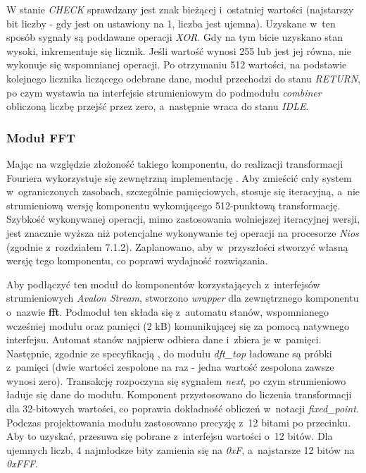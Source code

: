 W stanie \textit{CHECK} sprawdzany jest znak bieżącej i~ostatniej wartości (najstarszy bit liczby - gdy jest on ustawiony na 1, liczba jest ujemna). Uzyskane w~ten sposób sygnały są poddawane operacji \textit{XOR}. Gdy na tym bicie uzyskano stan wysoki, inkrementuje się licznik. Jeśli wartość wynosi 255 lub jest jej równa, nie wykonuje się wspomnianej operacji. Po otrzymaniu 512 wartości, na podstawie kolejnego licznika liczącego odebrane dane, moduł przechodzi do stanu \textit{RETURN}, po czym wystawia na interfejsie strumieniowym do podmodułu \textit{combiner} obliczoną liczbę przejść przez zero, a~następnie wraca do stanu \textit{IDLE}.

\subsubsection{Moduł FFT}

Mając na względzie złożoność takiego komponentu, do realizacji transformacji Fouriera wykorzystuje się zewnętrzną implementację \cite{Spiral}. Aby zmieścić cały system w~ograniczonych zasobach, szczególnie pamięciowych, stosuje się iteracyjną, a~nie strumieniową wersję komponentu wykonującego 512-punktową transformację. Szybkość wykonywanej operacji, mimo zastosowania wolniejszej iteracyjnej wersji, jest znacznie wyższa niż potencjalne wykonywanie tej operacji na procesorze \textit{Nios} (zgodnie z~rozdziałem 7.1.2). Zaplanowano, aby w~przyszłości stworzyć własną wersję tego komponentu, co poprawi wydajność rozwiązania.

Aby podłączyć ten moduł do komponentów korzystających z~interfejsów strumieniowych \textit{Avalon Stream}, stworzono \textit{wrapper} dla zewnętrznego komponentu o~nazwie \textbf{fft}. Podmoduł ten składa się z~automatu stanów, wspomnianego wcześniej modułu oraz pamięci (2 kB) komunikującej się za pomocą natywnego interfejsu. Automat stanów najpierw odbiera dane i~zbiera je w~pamięci. Następnie, zgodnie ze specyfikacją \cite{Spiral}, do modułu \textit{dft\_top} ładowane są próbki z~pamięci (dwie wartości zespolone na raz - jedna wartość zespolona zawsze wynosi zero). Transakcję rozpoczyna się sygnałem \textit{next}, po czym strumieniowo ładuje się dane do modułu. Komponent przystosowano do liczenia transformacji dla 32-bitowych wartości, co poprawia dokładność obliczeń w~notacji \textit{fixed\_point}. Podczas projektowania modułu zastosowano precyzję z~12 bitami po przecinku. Aby to uzyskać, przesuwa się pobrane z~interfejsu wartości o~12 bitów. Dla ujemnych liczb, 4 najmłodsze bity zamienia się na \textit{0xF}, a~najstarsze 12 bitów na \textit{0xFFF}.

